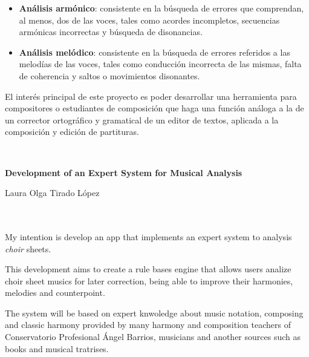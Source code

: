 \documentclass[a4paper, 12pt]{report} %
\numberwithin{equation}{section} %
\numberwithin{figure}{section} %
\numberwithin{table}{section} %
\begin{document}
\begin{itemize}
	\item \textbf{Análisis armónico}: consistente en la búsqueda de errores que comprendan, al menos, dos de las voces, tales como acordes incompletos, secuencias armónicas incorrectas y búsqueda de disonancias.
	\item  \textbf{Análisis melódico}: consistente en la búsqueda de errores referidos a las melodías de las voces, tales como conducción incorrecta de las mismas, falta de coherencia y saltos o movimientos disonantes. 
\end{itemize}

\bigskip

El interés principal de este proyecto es poder desarrollar una herramienta para compositores o estudiantes de composición que haga una función análoga a la de un corrector ortográfico y gramatical de un editor de textos, aplicada a la composición y edición de partituras.

\cleardoublepage
\newpage
\thispagestyle{empty}
\

\begin{center}
{\large\bfseries Development of an Expert System for Musical Analysis}\\
\end{center}
\begin{center}
Laura Olga Tirado López\\
\end{center}

\\

\vspace{0.7cm}
\\

My intention is develop an app that implements an expert system to analysis \textit{choir} sheets.

\bigskip

This development aims to create a rule bases engine that allows users analize choir sheet musics for later correction, being able to improve their harmonies, melodies and counterpoint.

\bigskip

The system will be based on expert knwoledge about music notation, composing and classic harmony provided by many harmony and composition teachers of Conservatorio Profesional Ángel Barrios, musicians and another sources such as books and musical tratrises.
\end{document}
